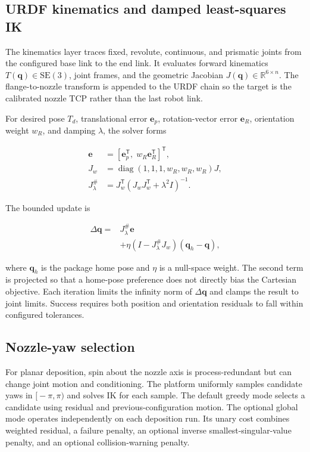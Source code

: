 \documentclass[letterpaper,10pt,conference]{ieeeconf}
\newcommand{\se}{\mathrm{SE}(3)}
\newcommand{\RR}{\mathbb{R}}
\begin{document}
\subsection{URDF kinematics and damped least-squares IK}

The kinematics layer traces fixed, revolute, continuous, and prismatic joints
from the configured base link to the end link.  It evaluates forward kinematics
\(T(\bm q)\in\se\), joint frames, and the geometric Jacobian
\(J(\bm q)\in\RR^{6\times n}\).  The flange-to-nozzle transform is appended to
the URDF chain so the target is the calibrated nozzle TCP rather than the last
robot link.

For desired pose \(T_d\), translational error \(\bm e_p\), rotation-vector
error \(\bm e_R\), orientation weight \(w_R\), and damping \(\lambda\), the
solver forms

\begin{align}
  \bm e &= [\bm e_p^\mathsf{T},\;w_R\bm e_R^\mathsf{T}]^\mathsf{T},\\
  J_w &= \operatorname{diag}(1,1,1,w_R,w_R,w_R)J,\\
  J_\lambda^{\#} &= J_w^\mathsf{T}
  (J_wJ_w^\mathsf{T}+\lambda^2 I)^{-1}.
\end{align}

The bounded update is

\begin{equation}
  \begin{aligned}
  \Delta\bm q ={}& J_\lambda^{\#}\bm e \\
  &+ \eta (I-J_\lambda^{\#}J_w)(\bm q_h-\bm q),
  \end{aligned}
  \label{eq:dls}
\end{equation}

where \(\bm q_h\) is the package home pose and \(\eta\) is a null-space weight.
The second term is projected so that a home-pose preference does not directly
bias the Cartesian objective.  Each iteration limits the infinity norm of
\(\Delta\bm q\) and clamps the result to joint limits.  Success requires both
position and orientation residuals to fall within configured tolerances.

\subsection{Nozzle-yaw selection}

For planar deposition, spin about the nozzle axis is process-redundant but can
change joint motion and conditioning.  The platform uniformly samples candidate
yaws in \([\! -\pi,\pi)\) and solves IK for each sample.  The default greedy mode
selects a candidate using residual and previous-configuration motion.  The
optional global mode operates independently on each deposition run.  Its unary
cost combines weighted residual, a failure penalty, an optional inverse
smallest-singular-value penalty, and an optional collision-warning penalty.
\end{document}
